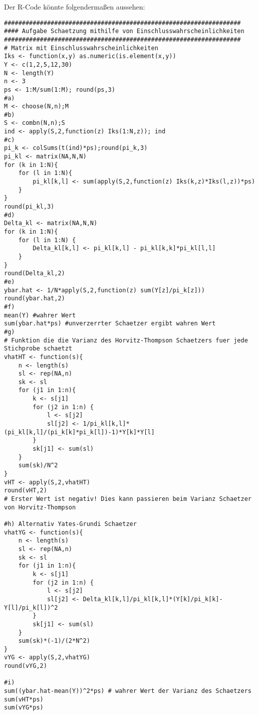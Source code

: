 \documentclass{article}
\begin{document}
\begin{solution}
Der R-Code könnte folgendermaßen aussehen:
\begin{lstlisting}
##################################################################
#### Aufgabe Schaetzung mithilfe von Einschlusswahrscheinlichkeiten
##################################################################
# Matrix mit Einschlusswahrscheinlichkeiten
Iks <- function(x,y) as.numeric(is.element(x,y))
Y <- c(1,2,5,12,30)
N <- length(Y)
n <- 3
ps <- 1:M/sum(1:M); round(ps,3)
#a)
M <- choose(N,n);M
#b)
S <- combn(N,n);S
ind <- apply(S,2,function(z) Iks(1:N,z)); ind
#c)
pi_k <- colSums(t(ind)*ps);round(pi_k,3)
pi_kl <- matrix(NA,N,N)
for (k in 1:N){
	for (l in 1:N){
		pi_kl[k,l] <- sum(apply(S,2,function(z) Iks(k,z)*Iks(l,z))*ps)
	}
}
round(pi_kl,3)
#d)
Delta_kl <- matrix(NA,N,N)
for (k in 1:N){
	for (l in 1:N) {
		Delta_kl[k,l] <- pi_kl[k,l] - pi_kl[k,k]*pi_kl[l,l]
	}
}
round(Delta_kl,2)
#e)
ybar.hat <- 1/N*apply(S,2,function(z) sum(Y[z]/pi_k[z]))
round(ybar.hat,2)
#f)
mean(Y) #wahrer Wert
sum(ybar.hat*ps) #unverzerrter Schaetzer ergibt wahren Wert
#g)
# Funktion die die Varianz des Horvitz-Thompson Schaetzers fuer jede Stichprobe schaetzt
vhatHT <- function(s){
	n <- length(s)
	sl <- rep(NA,n)
	sk <- sl
	for (j1 in 1:n){
		k <- s[j1]
		for (j2 in 1:n) {
			l <- s[j2]
			sl[j2] <- 1/pi_kl[k,l]*(pi_kl[k,l]/(pi_k[k]*pi_k[l])-1)*Y[k]*Y[l]
		}
		sk[j1] <- sum(sl)
	}
	sum(sk)/N^2
}
vHT <- apply(S,2,vhatHT)
round(vHT,2)
# Erster Wert ist negativ! Dies kann passieren beim Varianz Schaetzer von Horvitz-Thompson

#h) Alternativ Yates-Grundi Schaetzer
vhatYG <- function(s){
	n <- length(s)
	sl <- rep(NA,n)
	sk <- sl
	for (j1 in 1:n){
		k <- s[j1]
		for (j2 in 1:n) {
			l <- s[j2]
			sl[j2] <- Delta_kl[k,l]/pi_kl[k,l]*(Y[k]/pi_k[k]-Y[l]/pi_k[l])^2
		}
		sk[j1] <- sum(sl)
	}
	sum(sk)*(-1)/(2*N^2)
}
vYG <- apply(S,2,vhatYG)
round(vYG,2)

#i)
sum((ybar.hat-mean(Y))^2*ps) # wahrer Wert der Varianz des Schaetzers
sum(vHT*ps)
sum(vYG*ps)
\end{lstlisting}
\end{solution}
\end{document}
